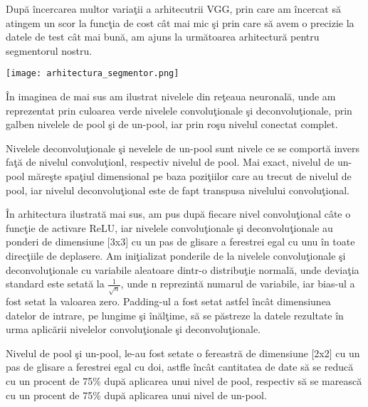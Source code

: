 Dup\u{a} \^{i}ncercarea multor varia\c{t}ii a arhitecutrii VGG, prin care am \^{i}ncercat s\u{a} atingem un scor la func\c{t}ia de cost c\^{a}t mai mic \c{s}i prin care s\u{a} avem o precizie la datele de test c\^{a}t mai bun\u{a}, am ajuns la urm\u{a}toarea arhitectur\u{a} pentru segmentorul nostru.

\begin{center}
\texttt{[image: arhitectura\_segmentor.png]}
\end{center}

\^{I}n imaginea de mai sus am ilustrat nivelele din re\c{t}eaua neuronal\u{a}, unde am reprezentat prin culoarea verde nivelele convolu\c{t}ionale \c{s}i deconvolu\c{t}ionale, prin galben nivelele de pool \c{s}i de un-pool, iar prin ro\c{s}u nivelul conectat complet.

\par

Nivelele deconvolu\c{t}ionale \c{s}i nevelele de un-pool sunt nivele ce se comport\u{a} invers fa\c{t}\u{a} de nivelul convolu\c{t}ionl, respectiv nivelul de pool. Mai exact, nivelul de un-pool m\u{a}re\c{s}te spa\c{t}iul dimensional pe baza pozi\c{t}iilor care au trecut de nivelul de pool, iar nivelul deconvolu\c{t}ional este de fapt transpusa nivelului convolu\c{t}ional.

\par

\^{I}n arhitectura ilustrat\u{a} mai sus, am pus dup\u{a} fiecare nivel convolu\c{t}ional c\^{a}te o func\c{t}ie de activare ReLU, iar nivelele convolu\c{t}ionale \c{s}i deconvolu\c{t}ionale au ponderi de dimensiune [3x3] cu un pas de glisare a ferestrei egal cu unu \^{i}n toate direc\c{t}iile de deplasere. Am ini\c{t}ializat ponderile de la nivelele convolu\c{t}ionale \c{s}i deconvolu\c{t}ionale cu variabile aleatoare dintr-o distribu\c{t}ie normal\u{a}, unde devia\c{t}ia standard este setat\u{a} la $\frac{1}{\sqrt{n}}$, unde n reprezint\u{a} numarul de variabile, iar bias-ul a fost setat la valoarea zero. Padding-ul a fost setat astfel \^{i}nc\^{a}t dimensiunea datelor de intrare, pe lungime \c{s}i \^{i}n\u{a}l\c{t}ime, s\u{a} se p\u{a}streze la datele rezultate \^{i}n urma aplic\u{a}rii nivelelor convolu\c{t}ionale \c{s}i deconvolu\c{t}ionale.

\par

Nivelul de pool \c{s}i un-pool, le-au fost setate o fereastr\u{a} de dimensiune [2x2] cu un pas de glisare a ferestrei egal cu doi, astfle \^{i}nc\^{a}t cantitatea de date s\u{a} se reduc\u{a} cu un procent de 75\% dup\u{a} aplicarea unui nivel de pool, respectiv s\u{a} se mareasc\u{a} cu un procent de 75\% dup\u{a} aplicarea unui nivel de un-pool.

